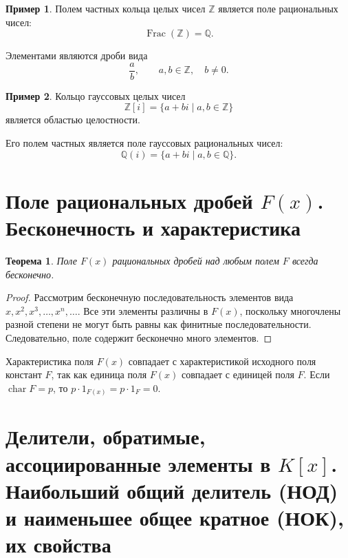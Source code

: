 \documentclass[12pt, a4paper]{article}
\newtheorem{theorem}{Теорема}
\theoremstyle{definition}
\newtheorem{example}{Пример}
\theoremstyle{remark}
\begin{document}
\begin{example}
	Полем частных кольца целых чисел $\mathbb{Z}$ является поле
	рациональных чисел:
	\[
	\operatorname{Frac}(\mathbb{Z})=\mathbb{Q}.
	\]
	
	Элементами являются дроби вида
	\[
	\frac{a}{b},
	\qquad
	a,b\in\mathbb{Z},\quad b\ne0.
	\]
\end{example}

\begin{example}
	Кольцо гауссовых целых чисел
	\[
	\mathbb{Z}[i]
	=
	\{a+bi\mid a,b\in\mathbb{Z}\}
	\]
	является областью целостности.
	
	Его полем частных является поле гауссовых рациональных чисел:
	\[
	\mathbb{Q}(i)
	=
	\{a+bi\mid a,b\in\mathbb{Q}\}.
	\]
\end{example}
\section{Поле рациональных дробей $F(x)$. Бесконечность и характеристика}

\begin{theorem}
	Поле $F(x)$ рациональных дробей над любым полем $F$ всегда бесконечно.
\end{theorem}
\begin{proof}
	Рассмотрим бесконечную последовательность элементов вида $x, x^2, x^3, \dots, x^n, \dots$. Все эти элементы различны в $F(x)$, поскольку многочлены разной степени не могут быть равны как финитные последовательности. Следовательно, поле содержит бесконечно много элементов.
\end{proof}

Характеристика поля $F(x)$ совпадает с характеристикой исходного поля констант $F$, так как единица поля $F(x)$ совпадает с единицей поля $F$. Если $\operatorname{char} F = p$, то $p \cdot 1_{F(x)} = p \cdot 1_F = 0$.

\section{Делители, обратимые, ассоциированные элементы в $K[x]$. Наибольший общий делитель (НОД) и наименьшее общее кратное (НОК), их свойства}
\end{document}
